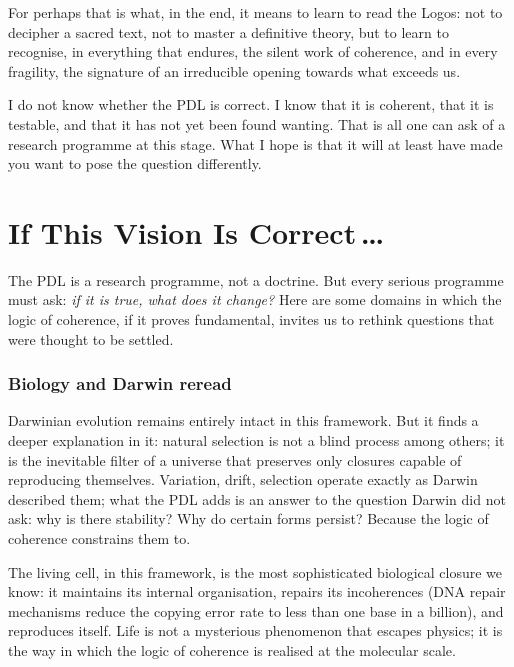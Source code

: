 \documentclass[11pt, a4paper, openright]{book}
\begin{document}
\medskip

For perhaps that is what, in the end, it means to learn to read the Logos: not to decipher a sacred text, not to master a definitive theory, but to learn to recognise, in everything that endures, the silent work of coherence, and in every fragility, the signature of an irreducible opening towards what exceeds us.

\medskip

I do not know whether the PDL is correct. I know that it is coherent, that it is testable, and that it has not yet been found wanting. That is all one can ask of a research programme at this stage. What I hope is that it will at least have made you want to pose the question differently.

\chapter{If This Vision Is Correct\texorpdfstring{\,\ldots}{...}}

The PDL is a research programme, not a doctrine. But every serious programme must ask: \emph{if it is true, what does it change?} Here are some domains in which the logic of coherence, if it proves fundamental, invites us to rethink questions that were thought to be settled.

\subsection*{Biology and Darwin reread}

Darwinian evolution remains entirely intact in this framework. But it finds a deeper explanation in it: natural selection is not a blind process among others; it is the inevitable filter of a universe that preserves only closures capable of reproducing themselves. Variation, drift, selection operate exactly as Darwin described them; what the PDL adds is an answer to the question Darwin did not ask: why is there stability? Why do certain forms persist? Because the logic of coherence constrains them to.

\medskip

The living cell, in this framework, is the most sophisticated biological closure we know: it maintains its internal organisation, repairs its incoherences (DNA repair mechanisms reduce the copying error rate to less than one base in a billion), and reproduces itself. Life is not a mysterious phenomenon that escapes physics; it is the way in which the logic of coherence is realised at the molecular scale.
\end{document}
